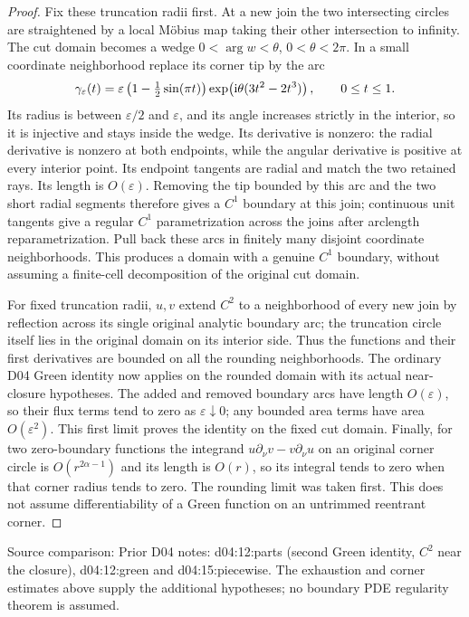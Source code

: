 \documentclass[11pt,a4paper,openany]{book}
\theoremstyle{definition}
\theoremstyle{remark}\newtheorem{remark}[theorem]{Remark}
\newcommand{\eps}{\varepsilon}\newcommand{\ee}{\varepsilon}
\newcommand{\source}[1]{\par\begingroup\small\sffamily\color{black!65}Source comparison: #1\par\endgroup}
\begin{document}
\begin{proof}
Fix these truncation radii first. At a new join the two intersecting circles are straightened by a local M\"obius map taking their other intersection to infinity. The cut domain becomes a wedge $0<\arg w<\theta$, $0<\theta<2\pi$. In a small coordinate neighborhood replace its corner tip by the arc
\[
 \gamma_\eps(t)=\eps\left(1-\tfrac12\sin(\pi t)\right)
       \exp\!\left(\iu\theta(3t^2-2t^3)\right),\qquad 0\le t\le1.
\]
Its radius is between $\eps/2$ and $\eps$, and its angle increases strictly in the interior, so it is injective and stays inside the wedge. Its derivative is nonzero: the radial derivative is nonzero at both endpoints, while the angular derivative is positive at every interior point. Its endpoint tangents are radial and match the two retained rays. Its length is $O(\eps)$. Removing the tip bounded by this arc and the two short radial segments therefore gives a $C^1$ boundary at this join; continuous unit tangents give a regular $C^1$ parametrization across the joins after arclength reparametrization. Pull back these arcs in finitely many disjoint coordinate neighborhoods. This produces a domain with a genuine $C^1$ boundary, without assuming a finite-cell decomposition of the original cut domain.

For fixed truncation radii, $u,v$ extend $C^2$ to a neighborhood of every new join by reflection across its single original analytic boundary arc; the truncation circle itself lies in the original domain on its interior side. Thus the functions and their first derivatives are bounded on all the rounding neighborhoods. The ordinary D04 Green identity now applies on the rounded domain with its actual near-closure hypotheses. The added and removed boundary arcs have length $O(\eps)$, so their flux terms tend to zero as $\eps\downarrow0$; any bounded area terms have area $O(\eps^2)$. This first limit proves the identity on the fixed cut domain. Finally, for two zero-boundary functions the integrand $u\partial_\nu v-v\partial_\nu u$ on an original corner circle is $O(r^{2\alpha-1})$ and its length is $O(r)$, so its integral tends to zero when that corner radius tends to zero. The rounding limit was taken first. This does not assume differentiability of a Green function on an untrimmed reentrant corner.
\end{proof}
\source{Prior D04 notes: d04:12:parts (second Green identity, $C^2$ near the closure), d04:12:green and d04:15:piecewise. The exhaustion and corner estimates above supply the additional hypotheses; no boundary PDE regularity theorem is assumed.}
\end{document}
